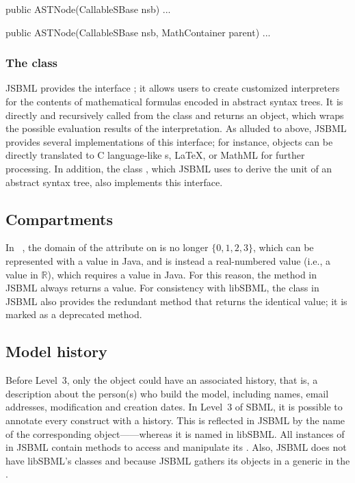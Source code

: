 \begin{example}
public ASTNode(CallableSBase nsb) { ... }

public ASTNode(CallableSBase nsb, MathContainer parent) { ... }
\end{example}


\subsubsection{The  class}

JSBML provides the interface \ASTNodeCompiler; it allows users to create
customized interpreters for the contents of mathematical formulas encoded
in abstract syntax trees. It is directly and recursively called from the
\ASTNode class and returns an \ASTNodeValue object, which wraps the
possible evaluation results of the interpretation.  As alluded to above,
JSBML provides several implementations of this interface; for instance,
\ASTNode objects can be directly translated to C language-like \String{}s,
\LaTeX,  or MathML  for further
processing.  In addition, the class \UnitsCompiler, which JSBML uses to
derive the unit of an abstract syntax tree, also implements this interface.


\subsection{Compartments}

In \SBMLthree~\citep{Hucka2010a}, the domain of the attribute
 on \Compartment is no longer $\lbrace 0, 1, 2,
3\rbrace$, which can be represented with a  value in Java, and is
instead a real-numbered value (i.e., a value in $\mathbb{R}$), which requires
a  value in Java. For this reason, the method
 in JSBML always returns a 
value. For consistency with libSBML, the \Compartment class in JSBML also
provides the redundant method  that
returns the identical value; it is marked as a deprecated method.
%
%


\subsection{Model history}

Before \SBML Level~3, only the \Model object could have an associated
history, that is, a description about the person(s) who build the model,
including names, email addresses, modification and creation dates.  In
Level~3 of SBML, it is possible to annotate every construct with a
history. This is reflected in JSBML by the name of the corresponding
object---\History---whereas it is named \ModelHistory in libSBML.  All
instances of \SBase in JSBML contain methods to access and manipulate its
\History. Also, JSBML does not have libSBML's classes \ModelCreator
and \ModelCreatorList because JSBML gathers its \Creator objects in a generic
 in the \History.


